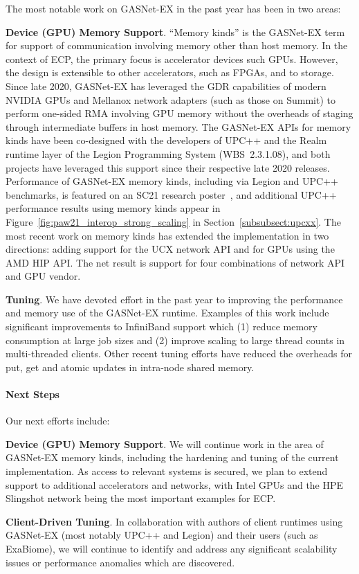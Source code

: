 The most notable work on GASNet-EX in the past year has been in two areas:

\textbf{Device (GPU) Memory Support}.
``Memory kinds'' is the GASNet-EX term for support of communication involving
memory other than host memory.  In the context of ECP, the primary focus is
accelerator devices such GPUs.  However, the design is extensible to other
accelerators, such as FPGAs, and to storage.
Since late 2020, GASNet-EX has leveraged the GDR
capabilities of modern NVIDIA GPUs and Mellanox network adapters (such as those
on Summit) to perform one-sided RMA involving GPU memory without
the overheads of staging through intermediate buffers in host memory.
The GASNet-EX APIs for memory kinds have been co-designed with the developers
of UPC++ and the Realm runtime layer of the Legion Programming System
(WBS~2.3.1.08), and both projects have leveraged this support since
their respective late 2020 releases.
Performance of GASNet-EX memory kinds, including via Legion and UPC++
benchmarks, is featured on an SC21 research poster~\cite{gasnet-poster-sc21},
and additional UPC++ performance results using memory kinds appear in
Figure~\ref{fig:paw21_interop_strong_scaling} in
Section~\ref{subsubsect:upcxx}.
The most recent work on memory kinds has extended the implementation in two directions:
adding support for the UCX network API and for GPUs using the AMD HIP API.
The net result is support for four combinations of network API and GPU vendor.

\textbf{Tuning}.
We have devoted effort in the past year to improving the performance and memory
use of the GASNet-EX runtime.  Examples of this work include significant
improvements to InfiniBand support which (1) reduce memory consumption at large
job sizes and (2) improve scaling to large thread counts in multi-threaded
clients.  Other recent tuning efforts have reduced the overheads for put, get
and atomic updates in intra-node shared memory.

\paragraph{Next Steps}

Our next efforts include:

\textbf{Device (GPU) Memory Support}.
We will continue work in the area of GASNet-EX memory kinds, including the
hardening and tuning of the current implementation.
As access to relevant systems is secured, we plan to extend support to
additional accelerators and networks, with Intel GPUs and the HPE Slingshot
network being the most important examples for ECP.

\textbf{Client-Driven Tuning}.
In collaboration with authors of client runtimes using GASNet-EX (most notably
UPC++ and Legion) and their users (such as ExaBiome), we will continue to
identify and address any significant scalability issues or performance
anomalies which are discovered.

\clearpage
